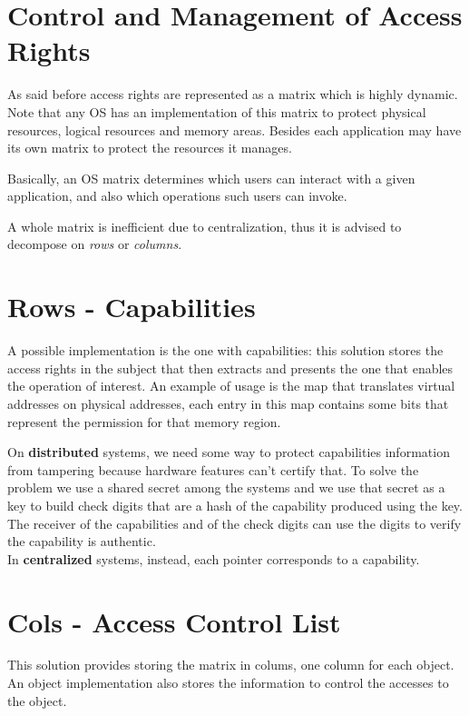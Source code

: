 \section{Control and Management of Access Rights}
As said before access rights are represented as a matrix which is highly dynamic.\\
Note that any OS has an implementation of this matrix to protect physical resources, logical resources and memory areas.
Besides each application may have its own matrix to protect the resources it manages.

Basically, an OS matrix determines which users can interact with a given application,
and also which operations such users can invoke.

A whole matrix is inefficient due to centralization, thus it is advised to decompose on \textit{rows} or \textit{columns}.

\section{Rows - Capabilities}
A possible implementation is the one with capabilities: this solution stores the access rights in the
subject that then extracts and presents the one that enables the operation of interest.
An example
of usage is the map that translates virtual addresses on physical addresses, each entry in this map
contains some bits that represent the permission for that memory region.

On \textbf{distributed} systems, we need some way to protect capabilities information from tampering because hardware features can’t certify that.
To solve the problem we use a shared secret among the systems and we use that secret as a key to build check digits that are a hash of the capability
produced using the key.
The receiver of the capabilities and of the check digits can use the digits to verify the capability is authentic.\\
In \textbf{centralized} systems, instead, each pointer corresponds to a capability.

\section{Cols - Access Control List}
This solution provides storing the matrix in colums, one column for each object.
An object implementation also stores the information to control the accesses to the object.

